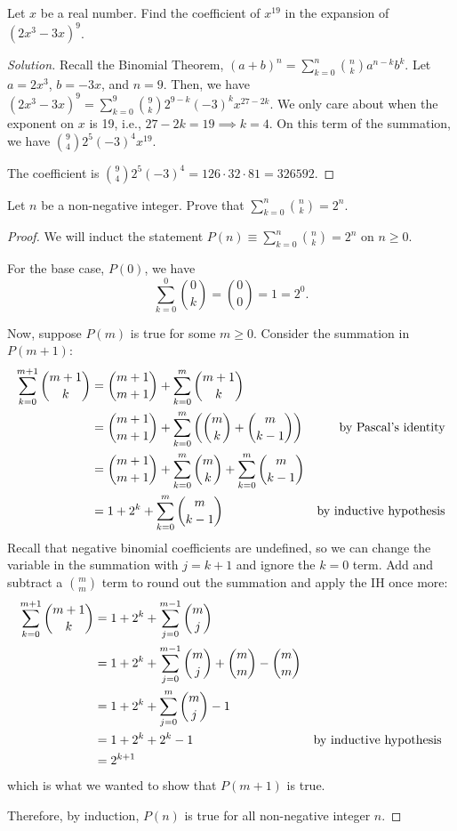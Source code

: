 \documentclass{agony}
\begin{document}
\question Let $x$ be a real number.
Find the coefficient of $x^{19}$ in the expansion of $(2x^3-3x)^9$.
\begin{proof}[Solution]
  Recall the Binomial Theorem, $(a+b)^n = \sum_{k=0}^n\binom{n}{k}a^{n-k}b^k$.
  Let $a = 2x^3$, $b = -3x$, and $n=9$.
  Then, we have $(2x^3-3x)^9 = \sum_{k=0}^9\binom{9}{k}2^{9-k}(-3)^k x^{27-2k}$.
  We only care about when the exponent on $x$ is 19, i.e., $27-2k=19 \implies k = 4$.
  On this term of the summation, we have $\binom{9}{4}2^5 (-3)^4 x^{19}$.

  The coefficient is $\binom{9}{4}2^5 (-3)^4 = 126 \cdot 32 \cdot 81 = 326592$.
\end{proof}


\question Let $n$ be a non-negative integer.
Prove that $\displaystyle \sum_{k=0}^n \binom{n}{k} = 2^n$.
\begin{proof}
  We will induct the statement $P(n) \equiv \sum_{k=0}^n \binom{n}{k} = 2^n$ on $n \geq 0$.

  For the base case, $P(0)$, we have \[ \sum_{k=0}^0 \binom{0}{k} = \binom{0}{0} = 1 = 2^0. \]

  Now, suppose $P(m)$ is true for some $m \geq 0$.
  Consider the summation in $P(m+1)$:
  \begin{align*}
    \sum_{k=0}^{m+1} \binom{m+1}{k}
     & = \binom{m+1}{m+1} + \sum_{k=0}^m \binom{m+1}{k}                                \\
     & = \binom{m+1}{m+1} + \sum_{k=0}^m \left( \binom{m}{k} + \binom{m}{k-1}  \right)
    & \text{by Pascal's identity}                                                             \\
     & = \binom{m+1}{m+1} + \sum_{k=0}^m \binom{m}{k} + \sum_{k=0}^m \binom{m}{k-1}    \\
     & = 1 + 2^k + \sum_{k=0}^m \binom{m}{k-1} & \text{by inductive hypothesis}
  \end{align*}
  Recall that negative binomial coefficients are undefined, so we can change the variable in the summation with $j=k+1$ and ignore the $k=0$ term.
  Add and subtract a $\binom{m}{m}$ term to round out the summation and apply the IH once more:
  \begin{align*}
    \sum_{k=0}^{m+1} \binom{m+1}{k}
     & = 1 + 2^k + \sum_{j=0}^{m-1} \binom{m}{j}                               \\
     & = 1 + 2^k + \sum_{j=0}^{m-1} \binom{m}{j} + \binom{m}{m} - \binom{m}{m} \\
     & = 1 + 2^k + \sum_{j=0}^{m} \binom{m}{j} - 1                             \\
     & = 1 + 2^k + 2^k - 1 & \text{by inductive hypothesis}                                                 \\
     & = 2^{k+1}
  \end{align*}
  which is what we wanted to show that $P(m+1)$ is true.

  Therefore, by induction, $P(n)$ is true for all non-negative integer $n$.
\end{proof}
\end{document}
